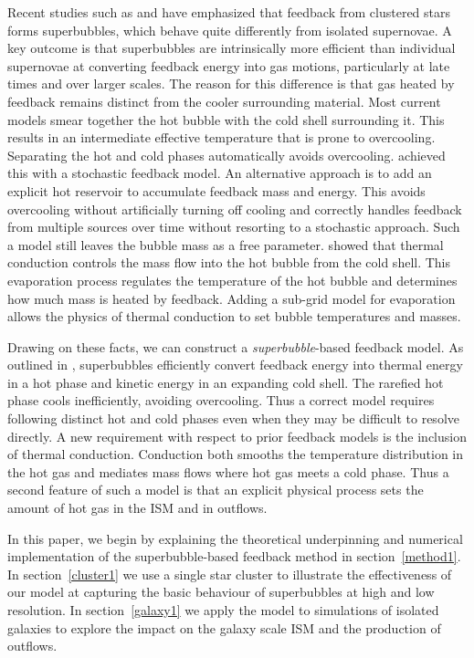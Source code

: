 Recent studies such as \citet{Nath2013} and \citet{Sharma2014} have emphasized
that feedback from clustered stars forms superbubbles, which behave quite
differently from isolated supernovae.   A key outcome is that superbubbles are
intrinsically more efficient than individual supernovae at converting feedback
energy into gas motions, particularly at late times and over larger scales.  The
reason for this difference is that gas heated by feedback remains distinct from
the cooler surrounding material.  Most current models smear together the hot
bubble with the cold shell surrounding it.  This results in an intermediate
effective temperature that is prone to overcooling.   Separating the hot and
cold phases automatically avoids overcooling.  \citet{DallaVecchia2012} achieved
this with a stochastic feedback model.  An alternative approach is to add an
explicit hot reservoir to accumulate feedback mass and energy.  This avoids
overcooling without artificially turning off cooling and correctly handles
feedback from multiple sources over time without resorting to a stochastic
approach.  Such a model still leaves the bubble mass as a free parameter.
\citet{MacLow1988} showed that thermal conduction controls the mass flow into
the hot bubble from the cold shell.  This evaporation process regulates the
temperature of the hot bubble and determines how much mass is heated by
feedback.   Adding a sub-grid model for evaporation allows the physics of
thermal conduction to set bubble temperatures and masses.

Drawing on these facts, we can construct a {\it superbubble}-based feedback
model.  As outlined in \citet{MacLow1988}, superbubbles efficiently convert
feedback energy into thermal energy in a hot phase and kinetic energy in an
expanding cold shell.  The rarefied hot phase cools inefficiently, avoiding
overcooling.  Thus a correct model requires following distinct hot and cold
phases even when they may be difficult to resolve directly.  A new requirement
with respect to prior feedback models is the inclusion of thermal conduction.
Conduction both smooths the temperature distribution in the hot gas and mediates
mass flows where hot gas meets a cold phase.  Thus a second feature of such a
model is that an explicit physical process sets the amount of hot gas in the ISM
and in outflows.

In this paper, we begin by explaining the theoretical underpinning and
numerical implementation of the superbubble-based feedback method in
section~\ref{method1}. 
In section~\ref{cluster1} we use a single star cluster to illustrate the
effectiveness of our model at capturing the basic behaviour of superbubbles at
high and low resolution.  In section~\ref{galaxy1} we apply the model to
simulations of isolated galaxies to explore the impact on the galaxy
scale ISM and the production of outflows.  

